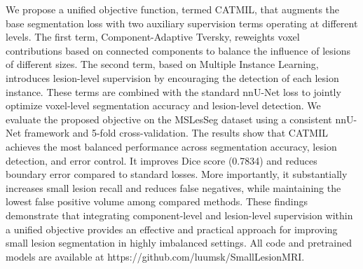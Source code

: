 We propose a unified objective function, termed CATMIL, that augments the base segmentation loss with two auxiliary supervision terms operating at different levels. The first term, Component-Adaptive Tversky, reweights voxel contributions based on connected components to balance the influence of lesions of different sizes. The second term, based on Multiple Instance Learning, introduces lesion-level supervision by encouraging the detection of each lesion instance. These terms are combined with the standard nnU-Net loss to jointly optimize voxel-level segmentation accuracy and lesion-level detection. We evaluate the proposed objective on the MSLesSeg dataset using a consistent nnU-Net framework and 5-fold cross-validation. The results show that CATMIL achieves the most balanced performance across segmentation accuracy, lesion detection, and error control. It improves Dice score (0.7834) and reduces boundary error compared to standard losses. More importantly, it substantially increases small lesion recall and reduces false negatives, while maintaining the lowest false positive volume among compared methods. These findings demonstrate that integrating component-level and lesion-level supervision within a unified objective provides an effective and practical approach for improving small lesion segmentation in highly imbalanced settings. All code and pretrained models are available at https://github.com/luumsk/SmallLesionMRI.
